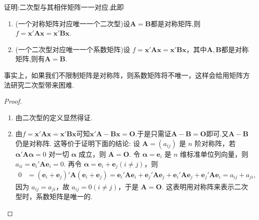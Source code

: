 \documentclass[../../main.tex]{subfiles}%
\begin{document}
\begin{theorem}\label{theorem:二次型与其相伴矩阵一一对应}
证明:二次型与其相伴矩阵一一对应.此即
\begin{enumerate}[(1)]
\item (一个对称矩阵对应唯一一个二次型)设$\boldsymbol{A}=\boldsymbol{B}$都是对称矩阵,则$f = \boldsymbol{x}'\boldsymbol{A}\boldsymbol{x}=\boldsymbol{x}'\boldsymbol{B}\boldsymbol{x}$.

\item (一个二次型对应唯一一个系数矩阵)设 $f = \boldsymbol{x}'\boldsymbol{A}\boldsymbol{x}=\boldsymbol{x}'\boldsymbol{B}\boldsymbol{x}$，其中$\boldsymbol{A},\boldsymbol{B}$都是对称矩阵,则有$\boldsymbol{A}=\boldsymbol{B}$. 
\end{enumerate}
\end{theorem}
\begin{remark}
事实上，如果我们不限制矩阵是对称阵，则系数矩阵将不唯一，这样会给用矩阵方法研究二次型带来困难.
\end{remark}
\begin{proof}
\begin{enumerate}[(1)]
\item 由二次型的定义显然得证.

\item 由$f = \boldsymbol{x}'\boldsymbol{A}\boldsymbol{x}=\boldsymbol{x}'\boldsymbol{B}\boldsymbol{x}$可知$\boldsymbol{x}'\boldsymbol{A-B}\boldsymbol{x}=\boldsymbol{O}$.于是只需证$\boldsymbol{A-B}=\boldsymbol{O}$即可.又$\boldsymbol{A-B}$仍是对称阵.
这等价于证明下面的结论: 设 $\boldsymbol{A}=(a_{ij})$ 是 $n$ 阶对称阵，若 $\boldsymbol{\alpha}'\boldsymbol{A}\boldsymbol{\alpha}=0$ 对一切 $\boldsymbol{\alpha}$ 成立，则 $\boldsymbol{A}=\boldsymbol{O}$. 令 $\boldsymbol{\alpha}=\boldsymbol{e}_i$ 是 $n$ 维标准单位列向量，则 $a_{ii}=\boldsymbol{e}_i'\boldsymbol{A}\boldsymbol{e}_i = 0$. 再令 $\boldsymbol{\alpha}=\boldsymbol{e}_i+\boldsymbol{e}_j (i\neq j)$，则
\begin{align*}
0&=(\boldsymbol{e}_i+\boldsymbol{e}_j)'\boldsymbol{A}(\boldsymbol{e}_i+\boldsymbol{e}_j)=\boldsymbol{e}_i'\boldsymbol{A}\boldsymbol{e}_i+\boldsymbol{e}_j'\boldsymbol{A}\boldsymbol{e}_j+\boldsymbol{e}_i'\boldsymbol{A}\boldsymbol{e}_j+\boldsymbol{e}_j'\boldsymbol{A}\boldsymbol{e}_i=a_{ij}+a_{ji},
\end{align*}
因为 $a_{ij}=a_{ji}$，故 $a_{ij}=0 (i\neq j)$，于是 $\boldsymbol{A}=\boldsymbol{O}$. 这表明用对称阵来表示二次型时，系数矩阵是唯一的. 
\end{enumerate}
\end{proof}
\end{document}
